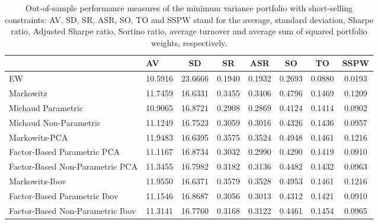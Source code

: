 \begin{table}

\caption{\label{tab:empirical_mvp}Out-of-sample performance measures of the minimum variance portfolio with short-selling constraints: AV, SD, SR, ASR, SO, TO and SSPW stand for the average, standard deviation, Sharpe ratio, Adjusted Sharpe ratio, Sortino ratio, average turnover and average sum of squared portfolio weights, respectively.}
\centering
\begin{tabular}[t]{l|l|c|c|c|c|c|c}
\hline
  & AV & SD & SR & ASR & SO & TO & SSPW\\
\hline
EW & 10.5916 & 23.6666 & 0.1940 & 0.1932 & 0.2693 & 0.0880 & 0.0193\\
\hline
Markowitz & 11.7459 & 16.6331 & 0.3455 & 0.3406 & 0.4796 & 0.1469 & 0.1209\\
\hline
Michaud Parametric & 10.9065 & 16.8721 & 0.2908 & 0.2869 & 0.4124 & 0.1414 & 0.0902\\
\hline
Michaud Non-Parametric & 11.1249 & 16.7523 & 0.3059 & 0.3016 & 0.4326 & 0.1436 & 0.0957\\
\hline
Markowitz-PCA & 11.9483 & 16.6395 & 0.3575 & 0.3524 & 0.4948 & 0.1461 & 0.1216\\
\hline
Factor-Based Parametric PCA & 11.1167 & 16.8734 & 0.3032 & 0.2990 & 0.4290 & 0.1419 & 0.0910\\
\hline
Factor-Based Non-Parametric PCA & 11.3455 & 16.7982 & 0.3182 & 0.3136 & 0.4482 & 0.1432 & 0.0963\\
\hline
Markowitz-Ibov & 11.9550 & 16.6371 & 0.3579 & 0.3528 & 0.4953 & 0.1461 & 0.1216\\
\hline
Factor-Based Parametric Ibov & 11.1546 & 16.8687 & 0.3056 & 0.3013 & 0.4312 & 0.1421 & 0.0910\\
\hline
Factor-Based Non-Parametric Ibov & 11.3141 & 16.7760 & 0.3168 & 0.3122 & 0.4461 & 0.1454 & 0.0965\\
\hline
\end{tabular}
\end{table}
